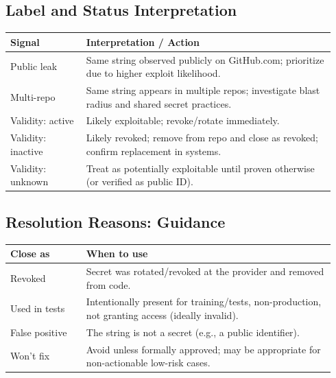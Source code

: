 \documentclass[11pt]{article}
\begin{document}
\subsection{Label and Status Interpretation}
\begin{longtable}{@{}p{0.22\linewidth}p{0.72\linewidth}@{}}
\toprule
\textbf{Signal} & \textbf{Interpretation / Action} \\
\midrule
Public leak & Same string observed publicly on GitHub.com; prioritize due to higher exploit likelihood. \\
Multi-repo & Same string appears in multiple repos; investigate blast radius and shared secret practices. \\
Validity: active & Likely exploitable; revoke/rotate immediately. \\
Validity: inactive & Likely revoked; remove from repo and close as revoked; confirm replacement in systems. \\
Validity: unknown & Treat as potentially exploitable until proven otherwise (or verified as public ID). \\
\bottomrule
\end{longtable}

\subsection{Resolution Reasons: Guidance}
\begin{longtable}{@{}p{0.22\linewidth}p{0.72\linewidth}@{}}
\toprule
\textbf{Close as} & \textbf{When to use} \\
\midrule
Revoked & Secret was rotated/revoked at the provider and removed from code. \\
Used in tests & Intentionally present for training/tests, non-production, not granting access (ideally invalid). \\
False positive & The string is not a secret (e.g., a public identifier). \\
Won't fix & Avoid unless formally approved; may be appropriate for non-actionable low-risk cases. \\
\bottomrule
\end{longtable}
\end{document}
